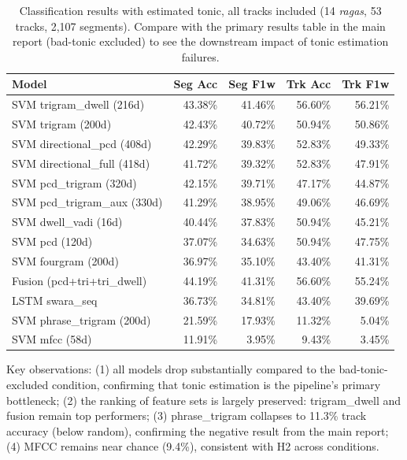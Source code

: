 \documentclass[11pt,a4paper]{article}
\begin{document}
\begin{table}[H]
\centering
\caption{Classification results with estimated tonic, all tracks included (14 \textit{ragas}, 53 tracks, 2,107 segments). Compare with the primary results table in the main report (bad-tonic excluded) to see the downstream impact of tonic estimation failures.}
\label{tab:app-est-all}
\small
\begin{tabular}{lrrrr}
\toprule
\textbf{Model} & \textbf{Seg Acc} & \textbf{Seg F1w} & \textbf{Trk Acc} & \textbf{Trk F1w} \\
\midrule
SVM trigram\_dwell (216d)        & 43.38\% & 41.46\% & 56.60\% & 56.21\% \\
SVM trigram (200d)               & 42.43\% & 40.72\% & 50.94\% & 50.86\% \\
SVM directional\_pcd (408d)     & 42.29\% & 39.83\% & 52.83\% & 49.33\% \\
SVM directional\_full (418d)    & 41.72\% & 39.32\% & 52.83\% & 47.91\% \\
SVM pcd\_trigram (320d)          & 42.15\% & 39.71\% & 47.17\% & 44.87\% \\
SVM pcd\_trigram\_aux (330d)    & 41.29\% & 38.95\% & 49.06\% & 46.69\% \\
SVM dwell\_vadi (16d)            & 40.44\% & 37.83\% & 50.94\% & 45.21\% \\
SVM pcd (120d)                   & 37.07\% & 34.63\% & 50.94\% & 47.75\% \\
SVM fourgram (200d)              & 36.97\% & 35.10\% & 43.40\% & 41.31\% \\
Fusion (pcd+tri+tri\_dwell)     & 44.19\% & 41.31\% & 56.60\% & 55.24\% \\
LSTM swara\_seq                  & 36.73\% & 34.81\% & 43.40\% & 39.69\% \\
SVM phrase\_trigram (200d)       & 21.59\% & 17.93\% & 11.32\% &  5.04\% \\
SVM mfcc (58d)                   & 11.91\% &  3.95\% &  9.43\% &  3.45\% \\
\bottomrule
\end{tabular}
\end{table}

Key observations: (1) all models drop substantially compared to the bad-tonic-excluded condition, confirming that tonic estimation is the pipeline's primary bottleneck; (2) the ranking of feature sets is largely preserved: trigram\_dwell and fusion remain top performers; (3) phrase\_trigram collapses to 11.3\% track accuracy (below random), confirming the negative result from the main report; (4) MFCC remains near chance (9.4\%), consistent with H2 across conditions.
\end{document}
